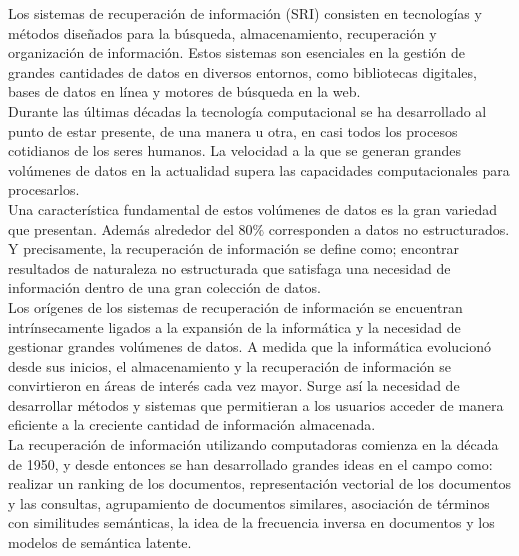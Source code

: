 Los sistemas de recuperación de información (SRI) consisten en tecnologías y métodos diseñados para 
la búsqueda, almacenamiento, recuperación y organización de información. Estos sistemas son esenciales en la 
gestión de grandes cantidades de datos en diversos entornos, como bibliotecas digitales, bases de datos en 
línea y motores de búsqueda en la web.\\ %
Durante las últimas décadas la tecnología computacional se ha desarrollado al punto de 
estar presente, de una manera u otra, en casi todos los procesos cotidianos de los seres humanos.
La velocidad a la que se generan grandes volúmenes de datos en la actualidad supera las capacidades 
computacionales para procesarlos.\\
Una característica fundamental de estos volúmenes de datos es la gran variedad que presentan. Además 
alrededor del 80$\%$ corresponden a datos no estructurados. Y precisamente, la recuperación de información 
se define como; encontrar resultados de naturaleza no estructurada que satisfaga una necesidad de información 
dentro de una gran colección de datos\cite{manning2008introductiontoIR}.\\
Los orígenes de los sistemas de recuperación de información se encuentran intrínsecamente ligados a la expansión de la 
informática y la necesidad de gestionar grandes volúmenes de datos. A medida que la informática evolucionó desde sus 
inicios, el almacenamiento y la recuperación de información se convirtieron en áreas de interés cada vez mayor. 
Surge así la necesidad de desarrollar métodos y sistemas que permitieran a los usuarios acceder de manera 
eficiente a la creciente cantidad de información almacenada.\\ %
La recuperación de información utilizando computadoras comienza en la década de 1950, y desde entonces se han 
desarrollado grandes ideas en el campo como: realizar un ranking de los documentos, representación 
vectorial de los documentos y las consultas, agrupamiento de documentos similares, asociación de términos 
con similitudes semánticas, la idea de la frecuencia inversa en documentos y los modelos de semántica latente.\\

